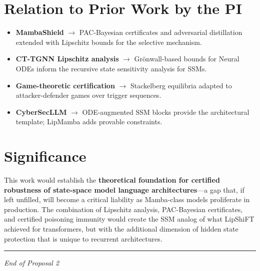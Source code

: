 \documentclass[12pt,a4paper]{article}
\begin{document}
\section{Relation to Prior Work by the PI}

\begin{itemize}
    \item \textbf{MambaShield} $\to$ PAC-Bayesian certificates and adversarial distillation extended with Lipschitz bounds for the selective mechanism.
    \item \textbf{CT-TGNN Lipschitz analysis} $\to$ Gr\"onwall-based bounds for Neural ODEs inform the recursive state sensitivity analysis for SSMs.
    \item \textbf{Game-theoretic certification} $\to$ Stackelberg equilibria adapted to attacker-defender games over trigger sequences.
    \item \textbf{CyberSecLLM} $\to$ ODE-augmented SSM blocks provide the architectural template; LipMamba adds provable constraints.
\end{itemize}

\section{Significance}

This work would establish the \textbf{theoretical foundation for certified robustness of state-space model language architectures}---a gap that, if left unfilled, will become a critical liability as Mamba-class models proliferate in production. The combination of Lipschitz analysis, PAC-Bayesian certificates, and certified poisoning immunity would create the SSM analog of what LipShiFT achieved for transformers, but with the additional dimension of hidden state protection that is unique to recurrent architectures.

\vspace{1cm}
\hrule
\vspace{0.3cm}
\begin{center}
\textit{End of Proposal 2}
\end{center}
\end{document}
